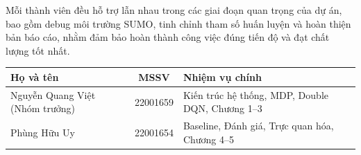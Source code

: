 \vspace{12pt}
Mỗi thành viên đều hỗ trợ lẫn nhau trong các giai đoạn quan trọng của dự án, bao gồm debug môi trường SUMO, tinh chỉnh tham số huấn luyện và hoàn thiện bản báo cáo, nhằm đảm bảo hoàn thành công việc đúng tiến độ và đạt chất lượng tốt nhất.

\vspace{10pt}
\begin{center}
\begin{tabular}{|l|c|p{7cm}|}
\hline
\textbf{Họ và tên} & \textbf{MSSV} & \textbf{Nhiệm vụ chính} \\
\hline
Nguyễn Quang Việt (Nhóm trưởng) & 22001659 & Kiến trúc hệ thống, MDP, Double DQN, Chương 1--3 \\
\hline
Phùng Hữu Uy & 22001654 & Baseline, Đánh giá, Trực quan hóa, Chương 4--5 \\
\hline
\end{tabular}
\end{center}
